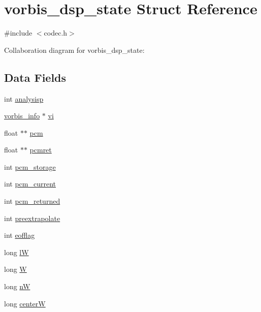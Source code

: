 \hypertarget{structvorbis__dsp__state}{}\section{vorbis\+\_\+dsp\+\_\+state Struct Reference}
\label{structvorbis__dsp__state}


{\ttfamily \#include $<$codec.\+h$>$}



Collaboration diagram for vorbis\+\_\+dsp\+\_\+state\+:
\subsection*{Data Fields}
\begin{DoxyCompactItemize}
\item 
int \hyperlink{structvorbis__dsp__state_a9b983a6901a311f2d354f2b6c51cf93b}{analysisp}
\item 
\hyperlink{structvorbis__info}{vorbis\+\_\+info} $\ast$ \hyperlink{structvorbis__dsp__state_ab6819a31e79031cdcd8f2ff40a5c1def}{vi}
\item 
float $\ast$$\ast$ \hyperlink{structvorbis__dsp__state_ab33bafd2638e5bea5737709feea89027}{pcm}
\item 
float $\ast$$\ast$ \hyperlink{structvorbis__dsp__state_ab2c2a87593f0d7a3c867ba80102c4260}{pcmret}
\item 
int \hyperlink{structvorbis__dsp__state_a33cf1637859094c31429dace6dfc79e2}{pcm\+\_\+storage}
\item 
int \hyperlink{structvorbis__dsp__state_a6d09bbf3927e337d721b05f669bd70c6}{pcm\+\_\+current}
\item 
int \hyperlink{structvorbis__dsp__state_a8db33e5f4c0b7f31f218c9ff6ccd7ac3}{pcm\+\_\+returned}
\item 
int \hyperlink{structvorbis__dsp__state_aecc3c42d23d876c8bfd396b5c2ac5eb6}{preextrapolate}
\item 
int \hyperlink{structvorbis__dsp__state_af48b32e7555d54a5d18a24385f1296d0}{eofflag}
\item 
long \hyperlink{structvorbis__dsp__state_a7086b355f6ffe286f388e95df943cac0}{lW}
\item 
long \hyperlink{structvorbis__dsp__state_a1cc3a520dcf831fb967341e5095c7b38}{W}
\item 
long \hyperlink{structvorbis__dsp__state_a2ada93ee1004bcc0803238ee4416bc1e}{nW}
\item 
long \hyperlink{structvorbis__dsp__state_a241d3dc3b6c931e93ce53cbf69282350}{centerW}

\end{DoxyCompactItemize}
